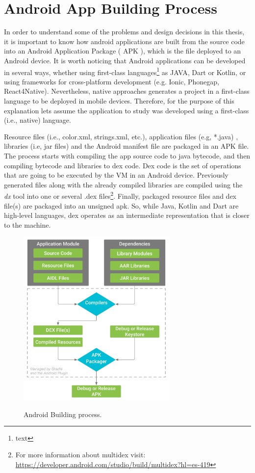 \section{Android App Building Process}

In order to understand some of the problems and design decisions  in this thesis, it is important to know how android applications are built from the source code into an Android Application Package ( APK ), which is the file deployed to an Android device. It is worth noticing that Android applications can be developed in several ways, whether using first-class languages\footnote{text} as JAVA, Dart or Kotlin, or using frameworks for cross-platform development (e.g. Ionic, Phonegap, React4Native). Nevertheless, native approaches generates a project in a first-class language to be deployed in mobile devices. Therefore, for the purpose of this explanation lets assume the application to study was developed using a first-class (i.e., native) language. 

Resource files (i.e., color.xml, strings.xml, etc.), application files (e.g, *.java) , libraries  (i.e, jar files) and the Android manifest file are packaged in an APK file. The process starts with compiling the app source code to java bytecode, and then compiling bytecode  and libraries to dex code. Dex code is the set of operations that are going to be executed by the VM in an Android device. Previously generated files along with the already compiled libraries are compiled using the  \textit{dx} tool into one or several .dex files\footnote{For more information about multidex visit: \url{https://developer.android.com/studio/build/multidex?hl=es-419}}. Finally, packaged resource files and dex file(s) are packaged into an unsigned apk. So, while Java, Kotlin and Dart are high-level languages, dex operates as an intermediate representation that is closer to the machine.

\begin{figure}[h!]
	\caption{Android Building process.}
	\centering
	\includegraphics[width=0.7\textwidth]{../Figures/android-build-process.png}
	\label{fig:abp}
\end{figure}


